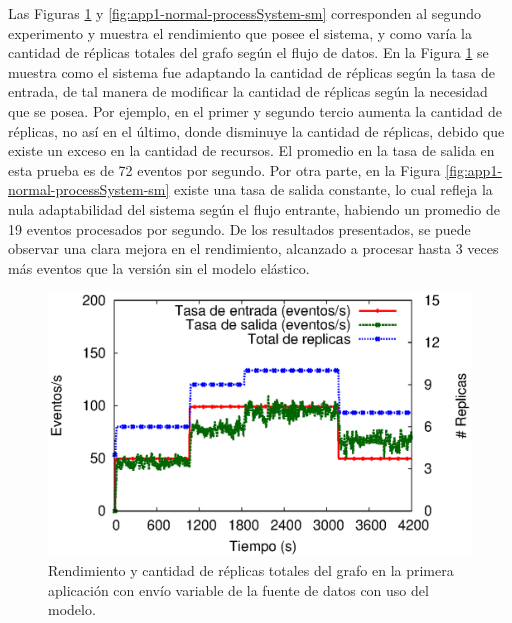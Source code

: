 Las Figuras \ref{fig:app1-normal-processSystem-cm} y \ref{fig:app1-normal-processSystem-sm} \normalsize{corresponden al segundo experimento y muestra el rendimiento que posee el sistema, y como varía la cantidad de réplicas totales del grafo según el flujo de datos.} En la Figura \ref{fig:app1-normal-processSystem-cm} \normalsize{se muestra como el sistema fue adaptando la cantidad de réplicas según la tasa de entrada, de tal manera de modificar la cantidad de réplicas según la necesidad que se posea. Por ejemplo, en el primer y segundo tercio aumenta la cantidad de réplicas, no así en el último, donde disminuye la cantidad de réplicas, debido que existe un exceso en la cantidad de recursos. El promedio en la tasa de salida en esta prueba es de 72 eventos por segundo.} Por otra parte, en la Figura \ref{fig:app1-normal-processSystem-sm} \normalsize{existe una tasa de salida constante, lo cual refleja la nula adaptabilidad del sistema según el flujo entrante, habiendo un promedio de 19 eventos procesados por segundo. De los resultados presentados, se puede observar una clara mejora en el rendimiento, alcanzado a procesar hasta 3 veces más eventos que la versión sin el modelo elástico.}

\begin{figure}[!ht]
	\centering
	\includegraphics[scale=0.7]{images/exp/app1/normal/cm/processSystem.eps}
    \caption{Rendimiento y cantidad de réplicas totales del grafo en la primera aplicación con envío variable de la fuente de datos con uso del modelo.}
	\label{fig:app1-normal-processSystem-cm}
\end{figure}

